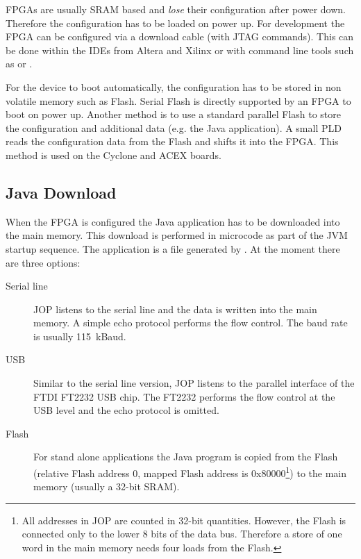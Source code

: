 FPGAs are usually SRAM based and \emph{lose} their configuration
after power down. Therefore the configuration has to be loaded on
power up. For development the FPGA can be configured via a download
cable (with JTAG commands). This can be done within the IDEs from
Altera and Xilinx or with command line tools such as
 or .

For the device to boot automatically, the configuration has to be
stored in non volatile memory such as Flash. Serial Flash is directly
supported by an FPGA to boot on power up. Another method is to use a
standard parallel Flash to store the configuration and additional
data (e.g. the Java application). A small PLD reads the configuration
data from the Flash and shifts it into the FPGA. This method is used
on the Cyclone and ACEX boards.

\subsection{Java Download}

 When the FPGA is configured the Java
application has to be downloaded into the main memory. This download
is performed in microcode as part of the JVM startup sequence. The
application is a  file generated by . At the
moment there are three options:

\begin{description}
    \item[Serial line] JOP listens to the serial line and the
        data is written into the main memory. A simple echo
        protocol performs the flow control. The baud rate is
        usually 115~kBaud.
    \item[USB] Similar to the serial line version, JOP listens to
        the parallel interface of the FTDI FT2232 USB chip. The
        FT2232 performs the flow control at the USB level and the
        echo protocol is omitted.
    \item[Flash] For stand alone applications the Java program is
    copied from the Flash (relative Flash address 0, mapped Flash
    address is 0x80000\footnote{All addresses in JOP are counted in
    32-bit quantities. However, the Flash is connected only to the
    lower 8 bits of the data bus. Therefore a store of one word in
    the main memory needs four loads from the Flash.}) to the main
    memory (usually a 32-bit SRAM).
\end{description}


